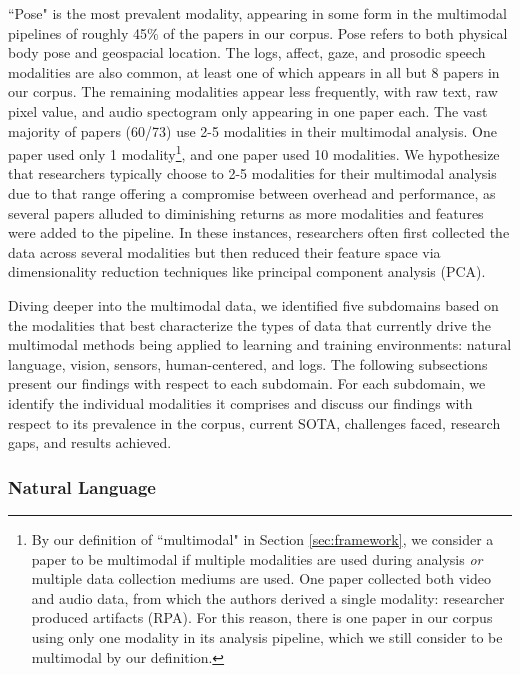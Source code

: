 \documentclass[manuscript,screen,review]{acmart}
\begin{document}
``Pose" is the most prevalent modality, appearing in some form in the multimodal pipelines of roughly 45\% of the papers in our corpus. Pose refers to both physical body pose and geospacial location. The logs, affect, gaze, and prosodic speech modalities are also common, at least one of which appears in all but 8 papers in our corpus. The remaining modalities appear less frequently, with raw text, raw pixel value, and audio spectogram only appearing in one paper each. The vast majority of papers (60/73) use 2-5 modalities in their multimodal analysis. One paper used only 1 modality\footnote{By our definition of ``multimodal" in Section \ref{sec:framework}, we consider a paper to be multimodal if multiple modalities are used during analysis \textit{or} multiple data collection mediums are used. One paper \cite{3809293172} collected both video and audio data, from which the authors derived a single modality: researcher produced artifacts (RPA). For this reason, there is one paper in our corpus using only one modality in its analysis pipeline, which we still consider to be multimodal by our definition.}, and one paper used 10 modalities. We hypothesize that researchers typically choose to 2-5 modalities for their multimodal analysis due to that range offering a compromise between overhead and performance, as several papers alluded to diminishing returns as more modalities and features were added to the pipeline. In these instances, researchers often first collected the data across several modalities but then reduced their feature space via dimensionality reduction techniques like principal component analysis (PCA). 

Diving deeper into the multimodal data, we identified five subdomains based on the modalities that best characterize the types of data that currently drive the multimodal methods being applied to learning and training environments: natural language, vision, sensors, human-centered, and logs. The following subsections present our findings with respect to each subdomain. For each subdomain, we identify the individual modalities it comprises and discuss our findings with respect to its prevalence in the corpus, current SOTA, challenges faced, research gaps, and results achieved.

\subsubsection{Natural Language}
\end{document}
